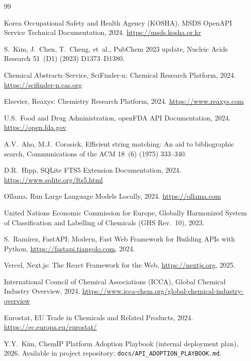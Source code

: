 \documentclass[preprint,12pt]{elsarticle}
\begin{document}
\begin{thebibliography}{99}

Korea Occupational Safety and Health Agency (KOSHA),
MSDS OpenAPI Service Technical Documentation, 2024.
\url{https://msds.kosha.or.kr}

S.~Kim, J.~Chen, T.~Cheng, et~al.,
PubChem 2023 update,
Nucleic Acids Research 51~(D1) (2023) D1373--D1380.

Chemical Abstracts Service,
SciFinder-n: Chemical Research Platform, 2024.
\url{https://scifinder-n.cas.org}

Elsevier,
Reaxys: Chemistry Research Platform, 2024.
\url{https://www.reaxys.com}

U.S.\ Food and Drug Administration,
openFDA API Documentation, 2024.
\url{https://open.fda.gov}

A.V.~Aho, M.J.~Corasick,
Efficient string matching: An aid to bibliographic search,
Communications of the ACM 18~(6) (1975) 333--340.

D.R.~Hipp,
SQLite FTS5 Extension Documentation, 2024.
\url{https://www.sqlite.org/fts5.html}

Ollama,
Run Large Language Models Locally, 2024.
\url{https://ollama.com}

United Nations Economic Commission for Europe,
Globally Harmonized System of Classification and Labelling of Chemicals (GHS Rev.~10), 2023.

S.~Ram\'{i}rez,
FastAPI: Modern, Fast Web Framework for Building APIs with Python,
\url{https://fastapi.tiangolo.com}, 2024.

Vercel,
Next.js: The React Framework for the Web,
\url{https://nextjs.org}, 2025.

International Council of Chemical Associations (ICCA),
Global Chemical Industry Overview, 2024.
\url{https://www.icca-chem.org/global-chemical-industry-overview}

Eurostat,
EU Trade in Chemicals and Related Products, 2024.
\url{https://ec.europa.eu/eurostat/}

Y.Y.~Kim,
ChemIP Platform Adoption Playbook (internal deployment plan), 2026.
Available in project repository: \texttt{docs/API\_ADOPTION\_PLAYBOOK.md}.

\end{thebibliography}
\end{document}
